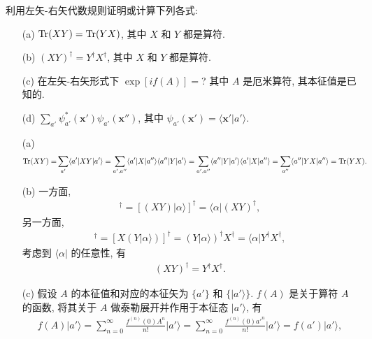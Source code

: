 \documentclass{assignment}
\begin{document}
\begin{prob}[课本习题 1.4]
    利用左矢-右矢代数规则证明或计算下列各式:
    \begin{itemize}
        \item[(a)] $\operatorname{Tr}(XY)=\operatorname{Tr}(YX)$, 其中 $X$ 和 $Y$ 都是算符.
        \item[(b)] $(XY)^{\dagger}=Y^{\dagger}X^{\dagger}$, 其中 $X$ 和 $Y$ 都是算符.
        \item[(c)] 在左矢-右矢形式下 $\exp[if(A)]=$? 其中 $A$ 是厄米算符, 其本征值是已知的.
        \item[(d)] $\sum_{a'}\psi_{a'}^*(\bm{x}')\psi_{a'}(\bm{x}'')$, 其中 $\psi_{a'}(\bm{x}')=\langle\bm{x}'\vert a'\rangle$.
    \end{itemize}
\end{prob}
\begin{sol}
    \begin{itemize}
        \item[(a)] 
        \begin{align}
            \operatorname{Tr}(XY)=&\sum_{a'}\langle a'\rvert XY\lvert a'\rangle=\sum_{a',a''}\langle a'\rvert X\lvert a''\rangle\langle a''\rvert Y\lvert a'\rangle=\sum_{a',a''}\langle a''\rvert Y\lvert a'\rangle\langle a'\rvert X\lvert a''\rangle=\sum_{a''}\langle a''\rvert YX\lvert a''\rangle=\operatorname{Tr}(YX).
        \end{align}
        \item[(b)] 一方面,
        \begin{align}
            [XY\lvert\alpha\rangle]^{\dagger}=[(XY)\lvert\alpha\rangle]^{\dagger}=\langle\alpha\rvert(XY)^{\dagger},
        \end{align}
        另一方面,
        \begin{align}
            [XY\lvert\alpha\rangle]^{\dagger}=[X(Y\lvert\alpha\rangle)]^{\dagger}=(Y\lvert\alpha\rangle)^{\dagger}X^{\dagger}=\langle\alpha\rvert Y^{\dagger}X^{\dagger},
        \end{align}
        考虑到 $\langle\alpha\rvert$ 的任意性, 有
        \begin{align}
            (XY)^{\dagger}=Y^{\dagger}X^{\dagger}.
        \end{align}
        \item[(c)] 假设 $A$ 的本征值和对应的本征矢为 $\{a'\}$ 和 $\{\lvert a'\rangle\}$. $f(A)$ 是关于算符 $A$ 的函数, 将其关于 $A$ 做泰勒展开并作用于本征态 $\lvert a'\rangle$, 有
        \begin{align}
            f(A)\lvert a'\rangle=\sum_{n=0}^{\infty}\frac{f^{(n)}(0)A^n}{n!}\lvert a'\rangle=\sum_{n=0}^{\infty}\frac{f^{(n)}(0){a'}^n}{n!}\lvert a'\rangle=f(a')\lvert a'\rangle,

\end{align}
\end{itemize}
\end{sol}
\end{document}
